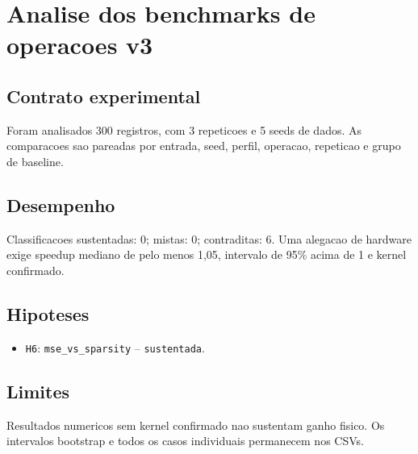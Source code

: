 \chapter{Analise dos benchmarks de operacoes v3}
\section{Contrato experimental}
Foram analisados 300 registros, com 3 repeticoes e 5 seeds de dados.
As comparacoes sao pareadas por entrada, seed, perfil, operacao, repeticao e grupo de baseline.
\section{Desempenho}
Classificacoes sustentadas: 0; mistas: 0; contraditas: 6.
Uma alegacao de hardware exige speedup mediano de pelo menos 1,05, intervalo de 95\% acima de 1 e kernel confirmado.
\section{Hipoteses}
\begin{itemize}
\item \texttt{H6}: \texttt{mse\_vs\_sparsity} -- \texttt{sustentada}.
\end{itemize}
\section{Limites}
Resultados numericos sem kernel confirmado nao sustentam ganho fisico. Os intervalos bootstrap e todos os casos individuais permanecem nos CSVs.
